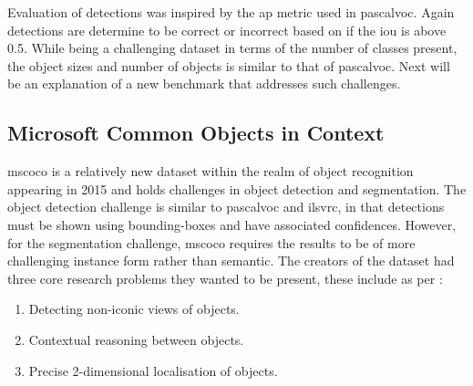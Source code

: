 Evaluation of detections was inspired by the \gls{ap} metric used in \gls{pascalvoc}. Again detections are determine to be correct or incorrect based on if the \gls{iou} is above 0.5. 
While being a challenging dataset in terms of the number of classes present, the object sizes and number of objects is similar to that of \gls{pascalvoc}. Next will be an explanation of a new benchmark that addresses such challenges.

\subsection{Microsoft Common Objects in Context}
\gls{mscoco} \cite{mscoco} is a relatively new dataset within the realm of object recognition appearing in 2015 and holds challenges in object detection and segmentation. The object detection challenge is similar to \gls{pascalvoc} and \gls{ilsvrc}, in that detections must be shown using bounding-boxes and have associated confidences. However, for the segmentation challenge, \gls{mscoco} requires the results to be of more challenging instance form rather than semantic. The creators of the dataset had three core research problems they wanted to be present, these include as per \cite{mscoco}:

\begin{enumerate}
	\item Detecting non-iconic views of objects.
	\item Contextual reasoning between objects.
	\item Precise 2-dimensional localisation of objects.
\end{enumerate}

